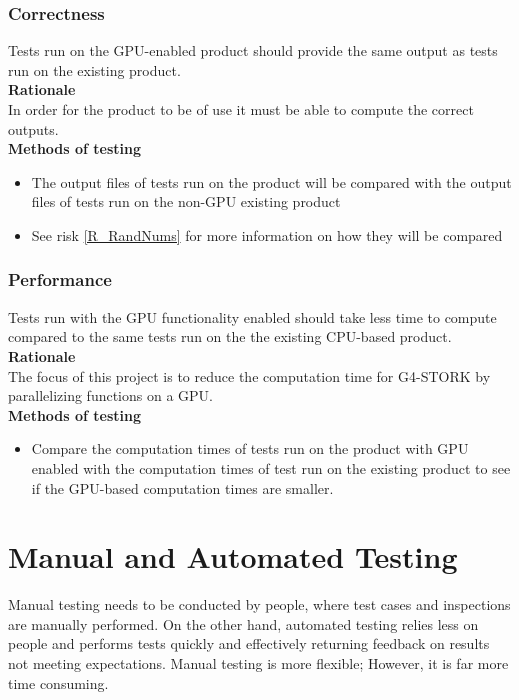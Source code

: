 \documentclass[12pt]{article}
\begin{document}
\subsubsection{Correctness}
Tests run on the GPU-enabled product should provide the same output as tests run on the existing product.\\

\textbf{Rationale}\\
In order for the product to be of use it must be able to compute the correct outputs.\\

\textbf{Methods of testing}
\begin{itemize}
\item The output files of tests run on the product will be compared with the output files of tests run on the non-GPU existing product
\item See risk \ref{R_RandNums} for more information on how they will be compared
\end{itemize}

\subsubsection{Performance}
Tests run with the GPU functionality enabled should take less time to compute compared to the same tests run on the the existing CPU-based product.\\

\textbf{Rationale}\\
The focus of this project is to reduce the computation time for G4-STORK by parallelizing functions on a GPU.\\

\textbf{Methods of testing}
\begin{itemize}
\item Compare the computation times of tests run on the product with GPU enabled with the computation times of test run on the existing product to see if the GPU-based computation times are smaller.
\end{itemize}
 
\section{Manual and Automated Testing}
Manual testing needs to be conducted by people, where test cases and inspections are manually performed. On the other hand, automated testing relies less on people and performs tests quickly and effectively returning feedback on results not meeting expectations. Manual testing is more flexible; However, it is far more time consuming.\\
\end{document}
